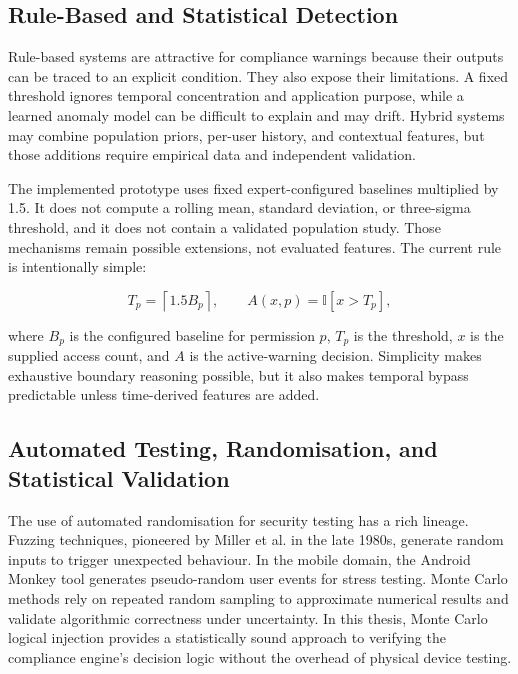 \subsection{Rule-Based and Statistical Detection}

Rule-based systems are attractive for compliance warnings because their outputs can be traced to an explicit condition. They also expose their limitations. A fixed threshold ignores temporal concentration and application purpose, while a learned anomaly model can be difficult to explain and may drift. Hybrid systems may combine population priors, per-user history, and contextual features, but those additions require empirical data and independent validation.

The implemented prototype uses fixed expert-configured baselines multiplied by 1.5. It does not compute a rolling mean, standard deviation, or three-sigma threshold, and it does not contain a validated population study. Those mechanisms remain possible extensions, not evaluated features. The current rule is intentionally simple:

\begin{equation}
T_p=\left\lceil 1.5B_p \right\rceil,\qquad
A(x,p)=\mathbb{I}[x>T_p],
\end{equation}

where $B_p$ is the configured baseline for permission $p$, $T_p$ is the threshold, $x$ is the supplied access count, and $A$ is the active-warning decision. Simplicity makes exhaustive boundary reasoning possible, but it also makes temporal bypass predictable unless time-derived features are added.

\subsection{Automated Testing, Randomisation, and Statistical Validation}

The use of automated randomisation for security testing has a rich lineage. Fuzzing techniques, pioneered by Miller et al. in the late 1980s, generate random inputs to trigger unexpected behaviour. In the mobile domain, the Android Monkey tool generates pseudo-random user events for stress testing. Monte Carlo methods rely on repeated random sampling to approximate numerical results and validate algorithmic correctness under uncertainty. In this thesis, Monte Carlo logical injection provides a statistically sound approach to verifying the compliance engine's decision logic without the overhead of physical device testing.

